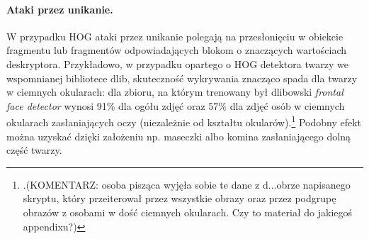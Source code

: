 \documentclass[12pt,a4paper,leqno,oneside,titlepage]{book}
\begin{document}
\paragraph{Ataki przez unikanie.}
W przypadku HOG ataki przez unikanie polegają na przesłonięciu w obiekcie fragmentu lub fragmentów odpowiadających blokom o znaczących wartościach deskryptora. Przykładowo, w przypadku opartego o HOG detektora twarzy we wspomnianej bibliotece dlib, skuteczność wykrywania znacząco spada dla twarzy w ciemnych okularach: dla zbioru, na którym trenowany był dlibowski \textit{frontal face detector} wynosi 91\% dla ogółu zdjęć oraz 57\% dla zdjęć osób w ciemnych okularach zasłaniających oczy (niezależnie od kształtu okularów).\footnote{.(KOMENTARZ: osoba pisząca wyjęła sobie te dane z d...obrze napisanego skryptu, który przeiterował przez wszystkie obrazy oraz przez podgrupę obrazów z osobami w dość ciemnych okularach. Czy to materiał do jakiegoś appendixu?) } Podobny efekt można uzyskać dzięki założeniu np. maseczki albo komina zasłaniającego dolną część twarzy\cite{dlibPage, MacDonald19}.
\end{document}
